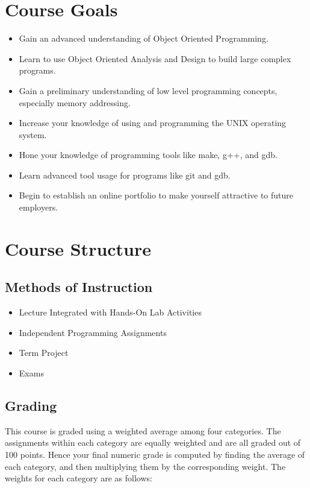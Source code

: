 \documentclass[11pt]{article}
\begin{document}
\section*{Course Goals}
\begin{itemize}
    \item Gain an advanced understanding of Object Oriented Programming.
    \item Learn to use Object Oriented Analysis and Design to build large
        complex programs.
    \item Gain a preliminary understanding of low level programming
        concepts, especially memory addressing.
    \item Increase your knowledge of using and programming the
        UNIX operating system.
    \item Hone your knowledge of programming tools like
        make, g++, and gdb.
    \item Learn advanced tool usage for programs like git and gdb.  
    \item Begin to establish an online portfolio to make yourself attractive 
        to future employers.
\end{itemize}

\section*{Course Structure}
\subsection*{Methods of Instruction}
\begin{itemize}
    \item Lecture Integrated with Hands-On Lab Activities
    \item Independent Programming Assignments
    \item Term Project
    \item Exams
\end{itemize}

\subsection*{Grading}
This course is graded using a weighted average among four categories.
The assignments within each category are equally weighted and are all
graded out of 100 points.  Hence your final numeric grade is
computed by finding the average of each category, and then multiplying
them by the corresponding weight.  The weights for each category are
as follows:
\end{document}
